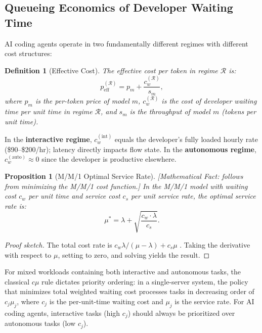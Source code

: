 \documentclass[11pt, a4paper]{googledeepmind}
\newtheorem{definition}{Definition}[section]
\newtheorem{proposition}{Proposition}[section]
\begin{document}
\subsection{Queueing Economics of Developer Waiting Time}

AI coding agents operate in two fundamentally different regimes with different cost structures:

\begin{definition}[Effective Cost]
\label{def:econ-effective-cost}
The \emph{effective cost per token} in regime $\mathcal{R}$ is:
\begin{equation}\label{eq:econ-effective-cost}
    p_{\text{eff}}^{(\mathcal{R})} = p_m + \frac{c_w^{(\mathcal{R})}}{s_m},
\end{equation}
where $p_m$ is the per-token price of model $m$, $c_w^{(\mathcal{R})}$ is the cost of developer waiting time per unit time in regime $\mathcal{R}$, and $s_m$ is the throughput of model $m$ (tokens per unit time).
\end{definition}

In the \textbf{interactive regime}, $c_w^{(\text{int})}$ equals the developer's fully loaded hourly rate (\$90--\$200/hr); latency directly impacts flow state. In the \textbf{autonomous regime}, $c_w^{(\text{auto})} \approx 0$ since the developer is productive elsewhere.

\begin{proposition}[M/M/1 Optimal Service Rate]
\label{prop:econ-optimal-mu}
\emph{[Mathematical Fact: follows from minimizing the M/M/1 cost function.]}
In the M/M/1 model with waiting cost $c_w$ per unit time and service cost $c_s$ per unit service rate, the optimal service rate is:
\begin{equation}\label{eq:econ-optimal-mu}
    \mu^* = \lambda + \sqrt{\frac{c_w \cdot \lambda}{c_s}}.
\end{equation}
\end{proposition}

\begin{proof}[Proof sketch]
The total cost rate is $c_w \lambda / (\mu - \lambda) + c_s \mu$ \citep{kleinrock1975}. Taking the derivative with respect to $\mu$, setting to zero, and solving yields the result.
\end{proof}

For mixed workloads containing both interactive and autonomous tasks, the classical $c\mu$ rule \citep{vanmieghem1995} dictates priority ordering: in a single-server system, the policy that minimizes total weighted waiting cost processes tasks in decreasing order of $c_j \mu_j$, where $c_j$ is the per-unit-time waiting cost and $\mu_j$ is the service rate. For AI coding agents, interactive tasks (high $c_j$) should always be prioritized over autonomous tasks (low $c_j$).
\end{document}
